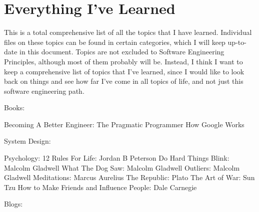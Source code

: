 \documentclass{article}
\begin{document}
\section*{Everything I've Learned}
This is a total comprehensive list of all the topics that I have learned. Individual files on these topics can be found in certain categories, which I will keep up-to-date in this document. Topics are not excluded to Software Engineering Principles, although most of them probably will be. Instead, I think I want to keep a comprehensive list of topics that I've learned, since I would like to look back on things and see how far I've come in all topics of life, and not just this software engineering path.

Books:

Becoming A Better Engineer:
The Pragmatic Programmer
How Google Works

System Design:

Psychology:
12 Rules For Life: Jordan B Peterson
Do Hard Things
Blink: Malcolm Gladwell
What The Dog Saw: Malcolm Gladwell
Outliers: Malcolm Gladwell
Meditations: Marcus Aurelius
The Republic: Plato
The Art of War: Sun Tzu
How to Make Friends and Influence People: Dale Carnegie

Blogs:
\end{document}
